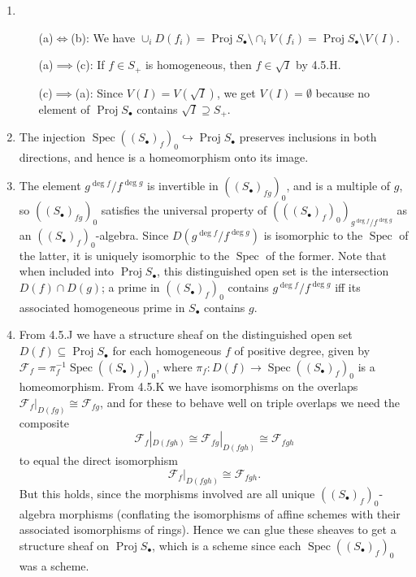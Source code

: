 \documentclass{report}
\newcommand{\rad}[1]{\sqrt{#1}} %
\newcommand{\scrF}{\mathscr{F}}
\DeclareMathOperator{\Spec}{Spec}
\DeclareMathOperator{\Proj}{Proj}
\begin{document}
\begin{enumerate}[label=\textbf{4.5.\Alph*.}]
	\item ~
	      \begin{itemize}
		      \item[(a)$\iff$(b):] We have $\cup_iD(f_i)
				      = \Proj S_\bullet\setminus\cap_iV(f_i)
				      = \Proj S_\bullet\setminus V(I)$.

		      \item[(a)$\implies$(c):] If $f\in S_+$ is homogeneous, then
			      $f\in\rad I$ by 4.5.H.

		      \item[(c)$\implies$(a):] Since $V(I)=V(\rad I)$, we get
			      $V(I)=\emptyset$ because no element of $\Proj S_\bullet$
			      contains $\rad I\supseteq S_+$.
	      \end{itemize}

	\item The injection $\Spec((S_\bullet)_f)_0\hookrightarrow\Proj S_\bullet$
	      preserves inclusions in both directions, and hence is a homeomorphism
	      onto its image.

	\item The element $g^{\deg f}/f^{\deg g}$ is invertible in
	      $((S_\bullet)_{fg})_0$, and is a multiple of $g$, so
	      $((S_\bullet)_{fg})_0$ satisfies the universal property of
	      $(((S_\bullet)_f)_0)_{g^{\deg f}/f^{\deg g}}$ as an
	      $((S_\bullet)_f)_0$-algebra. Since $D(g^{\deg f}/f^{\deg g})$ is
	      isomorphic to the $\Spec$ of the latter, it is uniquely isomorphic to
	      the $\Spec$ of the former. Note that when included into
	      $\Proj S_\bullet$, this distinguished open set is the intersection
	      $D(f)\cap D(g)$; a prime in $((S_\bullet)_f)_0$ contains
	      $g^{\deg f}/f^{\deg g}$ iff its associated homogeneous prime in
	      $S_\bullet$ contains $g$.

	\item From 4.5.J we have a structure sheaf on the distinguished open set
	      $D(f)\subseteq\Proj S_\bullet$ for each homogeneous $f$ of positive
	      degree, given by $\scrF_f=\pi_f^{-1}\Spec((S_\bullet)_f)_0$, where
	      $\pi_f:D(f)\to\Spec((S_\bullet)_f)_0$ is a homeomorphism. From 4.5.K we
	      have isomorphisms on the overlaps $\scrF_f|_{D(fg)} \cong \scrF_{fg}$,
	      and for these to behave well on triple overlaps we need the composite
	      \begin{equation*}
		      \scrF_f|_{D(fgh)} \cong \scrF_{fg}|_{D(fgh)} \cong \scrF_{fgh}
	      \end{equation*}
	      to equal the direct isomorphism
	      \begin{equation*}
		      \scrF_f|_{D(fgh)} \cong \scrF_{fgh}.
	      \end{equation*}
	      But this holds, since the morphisms involved are all unique
	      $((S_\bullet)_f)_0$-algebra morphisms (conflating the isomorphisms of
	      affine schemes with their associated isomorphisms of rings). Hence we
	      can glue these sheaves to get a structure sheaf on $\Proj S_\bullet$,
	      which is a scheme since each $\Spec((S_\bullet)_f)_0$ was a scheme.


\end{enumerate}
\end{document}
